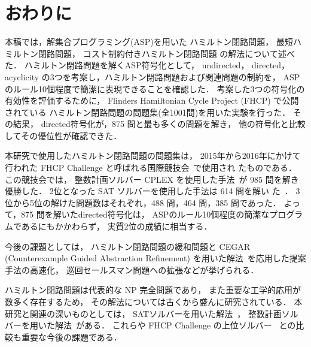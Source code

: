﻿%
\section{おわりに}\label{chap:conclusion}

本稿では，解集合プログラミング(ASP)を用いた
ハミルトン閉路問題，
最短ハミルトン閉路問題，
コスト制約付きハミルトン閉路問題
の解法について述べた．
%
ハミルトン閉路問題を解くASP符号化として，
\textsf{undirected}，
\textsf{directed}，
\textsf{acyclicity}
の3つを考案し，ハミルトン閉路問題および関連問題の制約を，
ASPのルール10個程度で簡潔に表現できることを確認した．
%
考案した3つの符号化の有効性を評価するために，
Flinders Hamiltonian Cycle Project (FHCP) で公開されている
ハミルトン閉路問題の問題集(全1001問)を用いた実験を行った．
その結果，
\textsf{directed}符号化が，875 問と最も多くの問題を解き，
他の符号化と比較してその優位性が確認できた．

本研究で使用したハミルトン閉路問題の問題集は，
2015年から2016年にかけて行われた 
FHCP Challenge と呼ばれる国際競技会~\cite{haythorpe19:fhcp}で使用され
たものである．
この競技会では，
整数計画ソルバー CPLEX を使用した手法~\cite{cohen17:1001graph}が 985
問を解き優勝した．
2位となった SAT ソルバーを使用した手法は 614 問を解い
た~\cite{andrew18:triple}．
3位から5位の解けた問題数はそれぞれ，488 問，464 問，385 問であった．
よって，875 問を解いた\textsf{directed}符号化は，
ASPのルール10個程度の簡潔なプログラムであるにもかかわらず，
実質2位の成績に相当する．

今後の課題としては，
ハミルトン閉路問題の緩和問題と
CEGAR (Counterexample Guided Abstraction Refinement)
を用いた解法~\cite{soh14:jelia2014,soh20:cegar}を応用した提案手法の高速化，
巡回セールスマン問題への拡張などが挙げられる．

ハミルトン閉路問題は代表的な NP 完全問題であり，
また重要な工学的応用が数多く存在するため，
その解法については古くから盛んに研究されている．
本研究と関連の深いものとしては，
SATソルバーを用いた解法~\cite{Prestwich03:DAM,VelevG09:relative,soh14:jelia2014}，
整数計画ソルバーを用いた解法~\cite{numata11:tsp}がある．
これらや FHCP Challenge の上位ソルバー~\cite{cohen17:1001graph,andrew18:triple}
との比較も重要な今後の課題である．

